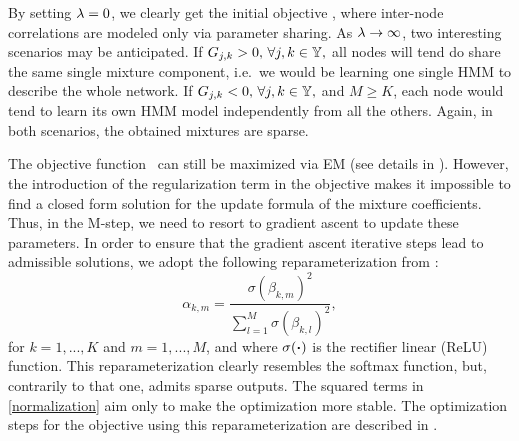 By setting $\lambda=0$, we clearly get the initial objective , where inter-node correlations are modeled only via parameter sharing. As $\lambda \to \infty$, two interesting scenarios may be anticipated. If ${G}_{j,k} > 0, \, \forall j,k \in {\mathbb{Y}},$ all nodes will tend do share the same single mixture component, i.e.\ we would be learning one single HMM to describe the whole network. If ${G}_{j,k} < 0, \, \forall j,k \in {\mathbb{Y}},$ and $M \geq K$, each node would tend to learn its own HMM model independently from all the others. Again, in both scenarios, the obtained mixtures are sparse.

The objective function~ can still be maximized via EM (see details in ). However, the introduction of the regularization term in the objective makes it impossible to find a closed form solution for the update formula of the mixture coefficients. Thus, in the M-step, we need to resort to gradient ascent to update these parameters. In order to ensure that the gradient ascent iterative steps lead to admissible solutions, we adopt the following reparameterization from \citet{Yang2018}:
\begin{equation}
\label{normalization}
\alpha_{k,m} = \frac{\sigma \left(\beta_{k,m} \right)^2}{\sum_{l=1}^M \sigma \left( \beta_{k,l} \right)^2}, 
\end{equation}
for $k = 1, ..., K$ and $m = 1, ..., M$, and where $\sigma(\boldsymbol{\cdot})$ is the rectifier linear (ReLU) function. This reparameterization clearly resembles the softmax function, but, contrarily to that one, admits sparse outputs. The squared terms in \eqref{normalization} aim only to make the optimization more stable. The optimization steps for the objective  using this reparameterization are described in .


